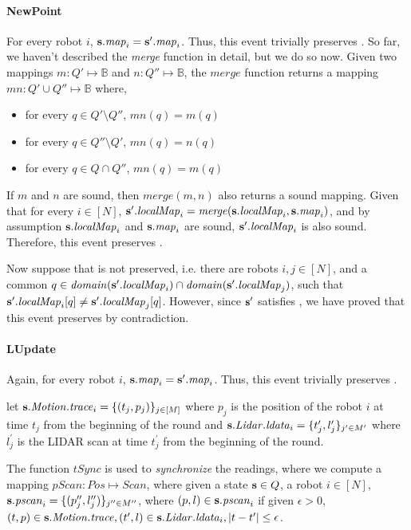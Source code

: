 \paragraph{NewPoint}
For every robot $i$, ${\textbf{s}}.\mathit{map}_i = {\textbf{s}}'.\mathit{map}_i$. Thus, this event trivially preserves . So far, we haven't described the \emph{merge} function in detail, but we do so now. Given two mappings $m:Q'\mapsto \mathbb{B}$ and $n:Q''\mapsto \mathbb{B}$, the $\mathit{merge}$ function returns a mapping $\mathit{mn}: Q'\cup Q'' \mapsto \mathbb{B}$ where, \begin{itemize}
      \item for every $q \in Q'\setminus Q''$, $\mathit{mn}(q) = m(q)$
      \item for every $q \in Q''\setminus Q'$, $\mathit{mn}(q) = n(q)$
      \item for every $q \in Q \cap Q''$, $\mathit{mn}(q) = m(q) $
\end{itemize}
If $m$ and $n$ are sound, then $\mathit{merge}(m,n)$ also returns a sound mapping. Given that for every $i\in [N]$, ${\textbf{s}}'.\mathit{localMap}_i = \mathit{merge}({\textbf{s}}.\mathit{localMap}_i,{\textbf{s}}.\mathit{map}_i)$, and by assumption ${\textbf{s}}.\mathit{localMap}_i$ and ${\textbf{s}}.\mathit{map}_i$ are sound, ${\textbf{s}}'.\mathit{localMap}_i$ is also sound. Therefore, this event preserves .

Now suppose that  is not preserved, i.e. there are robots  $i, j \in [N]$, and a common $q \in \mathit{domain}({\textbf{s}}'.\mathit{localMap}_i)\cap\mathit{domain}({\textbf{s}}'.\mathit{localMap}_j)$, such that ${\textbf{s}}'.\mathit{localMap}_i[q] \neq {\textbf{s}}'.\mathit{localMap}_j[q]$. However, since ${\textbf{s}}'$ satisfies , we have proved that this event preserves  by contradiction.

\paragraph{LUpdate}
Again, for every robot $i$, ${\textbf{s}}.\mathit{map}_i = {\textbf{s}}'.\mathit{map}_i$. Thus, this event trivially preserves .


let ${\textbf{s}}.\mathit{Motion.trace}_i = \{(t_j, p_j)\}_{j \in [M]}$ where $p_j$ is the position of the robot $i$ at time $t_j$ from the beginning of the round and  ${\textbf{s}}.\mathit{Lidar.ldata}_i = \{t_j^\prime, l_j^\prime\}_{j^\prime \in M^\prime}$ where $l_j^\prime$ is the LIDAR scan at time $t_j^\prime$ from the beginning of the round.

The function $\mathit{tSync}$ is used to \emph{synchronize} the readings, where we compute a mapping $\mathit{pScan}: \mathit{Pos} \mapsto \mathit{Scan}$, where given a state ${\textbf{s}}\in Q$, a robot $i\in [N]$,  ${\textbf{s}}.\mathit{pscan}_i = \{(p_j^{\prime\prime}, l_j^{\prime\prime})\}_{j^{\prime\prime} \in M ^{\prime\prime}}$, where  $(p, l) \in {\textbf{s}}.\mathit{pscan}_i$ if given $\epsilon > 0$,  $(t,p) \in {\textbf{s}}.\mathit{Motion.trace}, (t^\prime,l )\in {\textbf{s}}.\mathit{Lidar.ldata}_i, |t - t^\prime| \leq \epsilon$.


